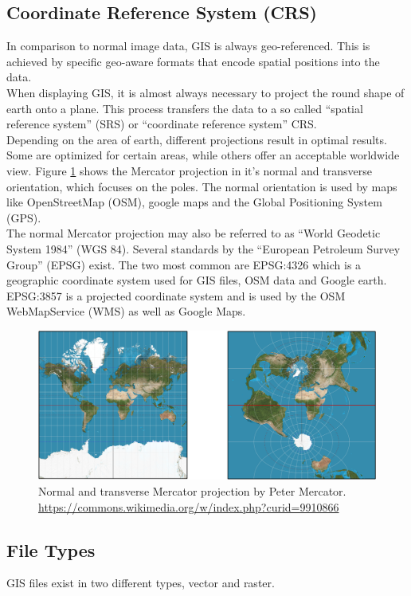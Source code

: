 \subsection{Coordinate Reference System (CRS)}
In comparison to normal image data, GIS is always geo-referenced. This is achieved by specific geo-aware formats that encode spatial positions into the data. \\
When displaying GIS, it is almost always necessary to project the round shape of earth onto a plane. This process transfers the data to a so called \enquote{spatial reference system} (SRS) or \enquote{coordinate reference system} CRS.\\
Depending on the area of earth, different projections result in optimal results. Some are optimized for certain areas, while others offer an acceptable worldwide view. Figure \ref{fig:mercator} shows the Mercator projection in it's normal and transverse orientation, which focuses on the poles. The normal orientation is used by maps like OpenStreetMap (OSM), google maps and the Global Positioning System (GPS).\\
The normal Mercator projection may also be referred to as \enquote{World Geodetic System 1984} (WGS 84). Several standards by the \enquote{European Petroleum Survey Group}  (EPSG) exist. The two most common are EPSG:4326 which is a geographic coordinate system used for GIS files, OSM data and Google earth. EPSG:3857 is a projected coordinate system and is used by the OSM WebMapService (WMS) as well as Google Maps.
\begin{figure}[H]
	\centering\includegraphics[width=1\textwidth]{res/Mercator}
	\caption{Normal and transverse Mercator projection by Peter Mercator. \url{https://commons.wikimedia.org/w/index.php?curid=9910866}}
	\label{fig:mercator}
\end{figure}


\subsection{File Types}
GIS files exist in two different types, vector and raster. 

